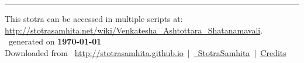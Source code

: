 \documentclass[a5paper,twoside,12pt]{book}
\begin{document}
\setmainfont[Script=Devanagari,Mapping=tex-text]{Sanskrit 2003}
\fontsize {16}{19.25}\selectfont
\let\head\chapt
\begin{center}

\end{center}
\vfill
\centering
\rule{0.8\textwidth}{0.6pt}

\footnotesize
{}\sffamily
This stotra can be accessed in multiple scripts at:\\
\url{http://stotrasamhita.net/wiki/Venkatesha_Ashtottara_Shatanamavali}.\\[1ex]
\faFilePdfO~generated on \textbf{\today}\\[1ex]
Downloaded from \faGlobe{}~\url{http://stotrasamhita.github.io}~|~\href{https://github.com/StotraSamhita}{\faGithubSquare{}~StotraSamhita}~|~\href{https://stotrasamhita.github.io/about/}{Credits}
\end{document}
